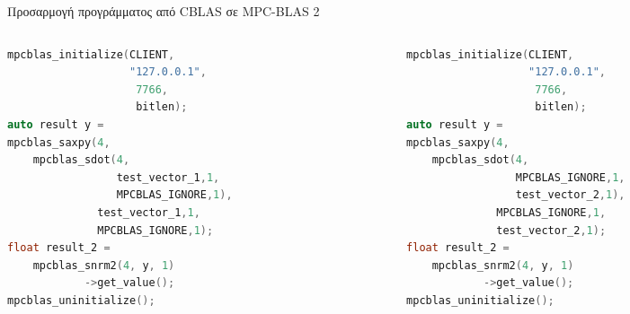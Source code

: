 \documentclass[10pt]{beamer}
\begin{document}
    \begin{frame}[fragile]{Προσαρμογή προγράμματος από CBLAS σε MPC-BLAS 2}
        \begin{columns}[c]
            \begin{column}{.48\textwidth}
                \begin{block}{}
                    \begin{lstlisting}[firstnumber=1, xleftmargin=5pt, basicstyle=\footnotesize, language=C++]
mpcblas_initialize(CLIENT,
                   "127.0.0.1",
                    7766,
                    bitlen);
auto result y =
mpcblas_saxpy(4,
    mpcblas_sdot(4,
                 test_vector_1,1,
                 MPCBLAS_IGNORE,1),
              test_vector_1,1,
              MPCBLAS_IGNORE,1);
float result_2 =
    mpcblas_snrm2(4, y, 1)
            ->get_value();
mpcblas_uninitialize();
                    \end{lstlisting}
                \end{block}
            \end{column}
            \hfill
            \begin{column}{.48\textwidth}
                \begin{block}{}
                    \begin{lstlisting}[firstnumber=1, xleftmargin=5pt, basicstyle=\footnotesize, language=C++]
mpcblas_initialize(CLIENT,
                   "127.0.0.1",
                    7766,
                    bitlen);
auto result y =
mpcblas_saxpy(4,
    mpcblas_sdot(4,
                 MPCBLAS_IGNORE,1,
                 test_vector_2,1),
              MPCBLAS_IGNORE,1,
              test_vector_2,1);
float result_2 =
    mpcblas_snrm2(4, y, 1)
            ->get_value();
mpcblas_uninitialize();
                    \end{lstlisting}
                \end{block}
            \end{column}%
        \end{columns}
    \end{frame}
\end{document}
